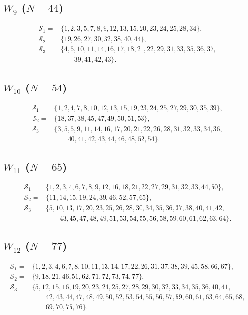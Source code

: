 \documentclass[11pt]{article}
\theoremstyle{definition}
\theoremstyle{remark}
\numberwithin{equation}{section}
\begin{document}
\subsection*{$W_9$ ($N=44$)}
\begin{align*}
\mathcal S_1={}&\{1,2,3,5,7,8,9,12,13,15,20,23,24,25,28,34\},\\
\mathcal S_2={}&\{19,26,27,30,32,38,40,44\},\\
\mathcal S_3={}&\{4,6,10,11,14,16,17,18,21,22,29,31,33,35,36,37,\\
&\qquad 39,41,42,43\}.
\end{align*}

\subsection*{$W_{10}$ ($N=54$)}
\begin{align*}
\mathcal S_1={}&\{1,2,4,7,8,10,12,13,15,19,23,24,25,27,29,30,35,39\},\\
\mathcal S_2={}&\{18,37,38,45,47,49,50,51,53\},\\
\mathcal S_3={}&\{3,5,6,9,11,14,16,17,20,21,22,26,28,31,32,33,34,36,\\
&\qquad40,41,42,43,44,46,48,52,54\}.
\end{align*}

\subsection*{$W_{11}$ ($N=65$)}
\begin{align*}
\mathcal S_1={}&\{1,2,3,4,6,7,8,9,12,16,18,21,22,27,29,31,32,33,44,50\},\\
\mathcal S_2={}&\{11,14,15,19,24,39,46,52,57,65\},\\
\mathcal S_3={}&\{5,10,13,17,20,23,25,26,28,30,34,35,36,37,38,40,41,42,\\
&\qquad43,45,47,48,49,51,53,54,55,56,58,59,60,61,62,63,64\}.
\end{align*}

\subsection*{$W_{12}$ ($N=77$)}
\begin{align*}
\mathcal S_1={}&\{1,2,3,4,6,7,8,10,11,13,14,17,22,26,31,37,38,39,45,58,66,67\},\\
\mathcal S_2={}&\{9,18,21,46,51,62,71,72,73,74,77\},\\
\mathcal S_3={}&\{5,12,15,16,19,20,23,24,25,27,28,29,30,32,33,34,35,36,40,41,\\
&\qquad42,43,44,47,48,49,50,52,53,54,55,56,57,59,60,61,63,64,65,68,\\
&\qquad69,70,75,76\}.
\end{align*}
\end{document}
